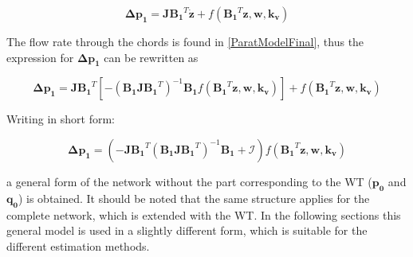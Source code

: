 \begin{equation}
  \bm{\Delta p_1} =  \bm{J {B_1}}^T \bm{\dot{z}} + f({\bm{B_1}}^T \bm{z}, \bm{w}, \bm{k_v})
 \end{equation}

The flow rate through the chords is found in \eqref{ParatModelFinal}, thus the expression for $ \bm{\Delta p_1} $ can be rewritten as

\begin{equation}
 \bm{ \Delta p_1} = \bm{ J {B_1}}^T [- (\bm{B_1 J {B_1}}^T)^{-1}\bm{B_1} f({\bm{B_1}}^T \bm{z},\bm{ w}, \bm{k_v})] + f({\bm{B_1}}^T \bm{z},\bm{ w}, \bm{k_v})
  \label{PressureLarge}
 \end{equation}
 
Writing in short form:
 
 \begin{equation}
  \bm{\Delta p_1} =  (-\bm{J {B_1}}^T (\bm{B_1 J {B_1}}^T)^{-1}\bm{B_1} + \bm{\mathcal{I}}) f({\bm{B_1}}^T \bm{z}, \bm{w}, \bm{k_v})
  \label{PressureShort}
 \end{equation}

a general form of the network without the part corresponding to the WT ($\bm{p_0}$ and $\bm{q_0}$) is obtained. It should be noted that the same structure applies for the complete network, which is extended with the WT. In the following sections this general model is used in a slightly different form, which is suitable for the different estimation methods. 


